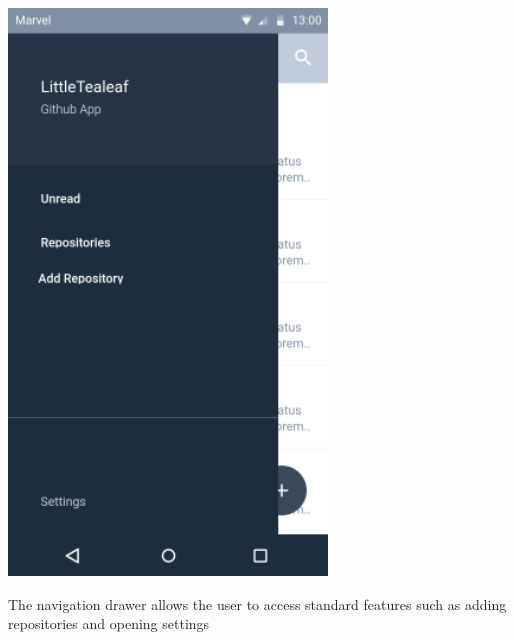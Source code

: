 \documentclass{report}
\begin{document}
\begin{center}
    \includegraphics[scale=0.5]{design-nav-drawer}
\end{center}
The navigation drawer allows the user to access standard features such as adding repositories and opening settings


\newpage
\end{document}
